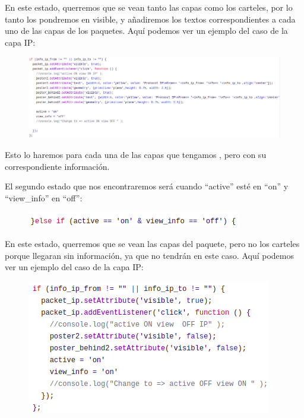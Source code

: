 \documentclass[a4paper, 12pt]{book}
\begin{document}
En este estado, querremos que se vean tanto las capas como los carteles, por lo tanto los pondremos en visible, y añadiremos los textos correspondientes a cada uno de las capas de los paquetes. Aquí podemos ver un ejemplo del caso de la capa IP:

\begin{figure}[h]

    \includegraphics[scale=0.45]{img/ejemplo1ip_comp_pack.png}
\end{figure}
Esto lo haremos para cada una de las capas que tengamos , pero con su correspondiente información.

El segundo estado que nos encontraremos será cuando “active” esté en “on” y “view\_info” en “off”:

\begin{figure}[h]
\centering
    \includegraphics[scale=0.7]{img/eventlist2_comp_pack.png}
\end{figure}

En este estado, querremos que se vean las capas del paquete, pero no los carteles porque llegaran sin información, ya que no tendrán en este caso. Aquí podemos ver un ejemplo del caso de la capa IP:

\begin{figure}[h]
\centering
    \includegraphics[scale=0.6]{img/ejemplo2ip_comp_pack.png}
\end{figure}
\end{document}
